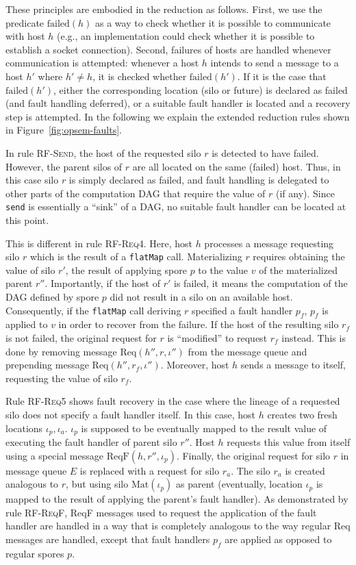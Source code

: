 \documentclass[preprint]{sigplanconf}
\theoremstyle{definition}
\theoremstyle{definition}
\begin{document}
These principles are embodied in the reduction as follows. First, we use the
predicate $\text{failed}(h)$ as a way to check whether it is possible to
communicate with host $h$ (e.g., an implementation could check whether it is
possible to establish a socket connection). Second, failures of hosts are
handled whenever communication is attempted: whenever a host $h$ intends to
send a message to a host $h'$ where $h' \neq h$, it is checked whether
$\text{failed}(h')$. If it is the case that $\text{failed}(h')$, either the
corresponding location (silo or future) is declared as failed (and fault
handling deferred), or a suitable fault handler is located and a recovery step
is attempted. In the following we explain the extended reduction rules shown
in Figure~\ref{fig:opsem-faults}.

In rule \textsc{RF-Send}, the host of the requested silo $r$ is detected to have
failed. However, the parent silos of $r$ are all located on the same (failed)
host. Thus, in this case silo $r$ is simply declared as failed, and fault
handling is delegated to other parts of the computation DAG that require the
value of $r$ (if any). Since \texttt{send} is essentially a ``sink'' of a DAG,
no suitable fault handler can be located at this point.

This is different in rule \textsc{RF-Req4}. Here, host $h$ processes a message
requesting silo $r$ which is the result of a \texttt{flatMap} call.
Materializing $r$ requires obtaining the value of silo $r'$, the result of
applying spore $p$ to the value $v$ of the materialized parent $r''$.
Importantly, if the host of $r'$ is failed, it means the computation of the
DAG defined by spore $p$ did not result in a silo on an available host.
Consequently, if the \texttt{flatMap} call deriving $r$ specified a fault
handler $p_f$, $p_f$ is applied to $v$ in order to recover from the failure.
If the host of the resulting silo $r_f$ is not failed, the original request
for $r$ is ``modified'' to request $r_f$ instead. This is done by removing
message $\text{Req}(h'', r, \iota'')$ from the message queue and prepending
message $\text{Req}(h'', r_f, \iota'')$. Moreover, host $h$ sends a message to
itself, requesting the value of silo $r_f$.

Rule \textsc{RF-Req5} shows fault recovery in the case where the lineage of a
requested silo does not specify a fault handler itself. In this case, host $h$
creates two fresh locations $\iota_p, \iota_a$. $\iota_p$ is supposed to be
eventually mapped to the result value of executing the fault handler of parent
silo $r''$. Host $h$ requests this value from itself using a special message
$\text{ReqF}(h, r'', \iota_p)$. Finally, the original request for silo $r$ in
message queue $E$ is replaced with a request for silo $r_a$. The silo $r_a$ is
created analogous to $r$, but using silo $\text{Mat}(\iota_p)$ as parent
(eventually, location $\iota_p$ is mapped to the result of applying the
parent's fault handler). As demonstrated by rule \textsc{RF-ReqF}, ReqF
messages used to request the application of the fault handler are handled in a
way that is completely analogous to the way regular Req messages are handled,
except that fault handlers $p_f$ are applied as opposed to regular spores $p$.
\end{document}

